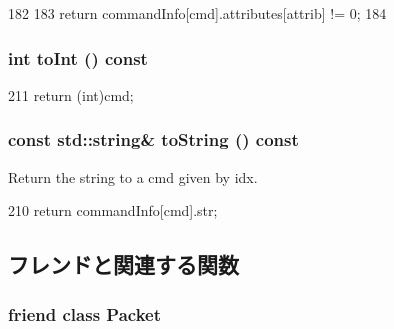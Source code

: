 \begin{DoxyCode}
182     {
183         return commandInfo[cmd].attributes[attrib] != 0;
184     }
\end{DoxyCode}
\hypertarget{classMemCmd_af7a5586bcba0f228f5acb3b37ebae263}{
\subsubsection[{toInt}]{\setlength{\rightskip}{0pt plus 5cm}int toInt () const}}
\label{classMemCmd_af7a5586bcba0f228f5acb3b37ebae263}



\begin{DoxyCode}
211 { return (int)cmd; }
\end{DoxyCode}
\hypertarget{classMemCmd_a3657c48eb6bb5ad66e3fc4b08c2f87df}{
\subsubsection[{toString}]{\setlength{\rightskip}{0pt plus 5cm}const std::string\& toString () const}}
\label{classMemCmd_a3657c48eb6bb5ad66e3fc4b08c2f87df}


Return the string to a cmd given by idx. 


\begin{DoxyCode}
210 { return commandInfo[cmd].str; }
\end{DoxyCode}


\subsection{フレンドと関連する関数}
\hypertarget{classMemCmd_ae51cb555166657e5996a76768db998e3}{
\subsubsection[{Packet}]{\setlength{\rightskip}{0pt plus 5cm}friend class {\bf Packet}}}
\label{classMemCmd_ae51cb555166657e5996a76768db998e3}


